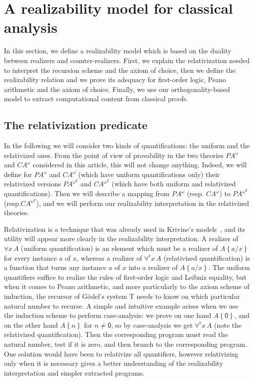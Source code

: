 \documentclass{CSML}
\newcommand*\LogVarA{x}
\newcommand*\LogConst[1]{\mathsf{#1}}
\newcommand*\LogRelForm[1]{{#1^\mathrm{r}}}
\newcommand*\LogForallRel{\forall^\mathrm{r}}
\newcommand*\LogFormA{A}
\newcommand*\LogSubst[1]{\left\{#1\right\}}
\newcommand*\ModElemA{a}
\newcommand*\PA{{P\!A}}
\newcommand*\PAom{{\PA^\omega}}
\newcommand*\CA{{C\!A}}
\newcommand*\CAom{{\CA^\omega}}
\newcommand*\CALogZ{\LogConst{0}}
\begin{document}
\section{A realizability model for classical analysis}
\label{modelOrthogonal}
In this section, we define a realizability model which is based on the duality between realizers and counter-realizers. First, we explain the relativization needed to interpret the recursion scheme and the axiom of choice, then we define the realizability relation and we prove its adequacy for first-order logic, Peano arithmetic and the axiom of choice. Finally, we use our orthogonality-based model to extract computational content from classical proofs.
\subsection{The relativization predicate}
\label{RelPred}
In the following we will consider two kinds of quantifications: the uniform and the relativized ones. From the point of view of provability in the two theories $\PAom$ and $\CAom$ considered in this article, this will not change anything. Indeed, we will define for $\PAom$ and $\CAom$ (which have uniform quantifications only) their relativized versions $\LogRelForm{\PAom}$ and $\LogRelForm{\CAom}$ (which have both uniform and relativized quantifications). Then we will describe a mapping from $\PAom$ (resp. $\CAom$) to $\LogRelForm{\PAom}$ (resp.$\LogRelForm{\CAom}$), and we will perform our realizability interpretation in the relativized theories.\par
Relativization is a technique that was already used in Krivine's models~\cite{KrivineStorage,OlivaStreicher,MiquelWitness}, and its utility will appear more clearly in the realizability interpretation. A realizer of $\forall\LogVarA\,\LogFormA$ (uniform quantification) is an element which must be a realizer of $\LogFormA\LogSubst{\ModElemA/\LogVarA}$ for every instance $\ModElemA$ of $\LogVarA$, whereas a realizer of $\LogForallRel\LogVarA\,\LogFormA$ (relativized quantification) is a function that turns any instance $\ModElemA$ of $\LogVarA$ into a realizer of $\LogFormA\LogSubst{\ModElemA/\LogVarA}$. The uniform quantifiers suffice to realize the rules of first-order logic and Leibniz equality, but when it comes to Peano arithmetic, and more particularly to the axiom scheme of induction, the recursor of G\"odel's system T needs to know on which particular natural number to recurse. A simple and intuitive example arises when we use the induction scheme to perform case-analysis: we prove on one hand $\LogFormA\LogSubst{\CALogZ}$, and on the other hand $\LogFormA\LogSubst{n}$ for $n\neq\CALogZ$, so by case-analysis we get $\LogForallRel\LogVarA\,\LogFormA$ (note the relativized quantification). Then the corresponding program must read the natural number, test if it is zero, and then branch to the corresponding program. One solution would have been to relativize all quantifiers, however relativizing only when it is necessary gives a better understanding of the realizability interpretation and simpler extracted programs.\par
\end{document}
